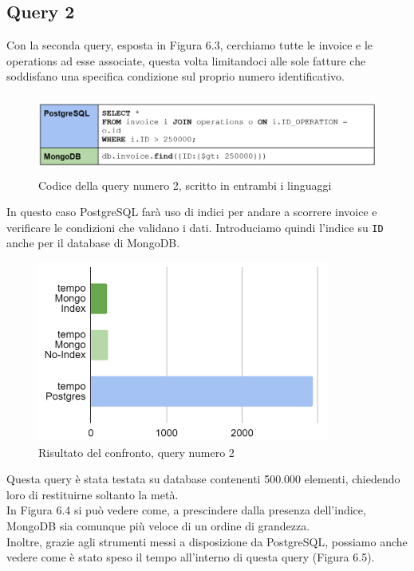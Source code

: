 \subsection{Query 2}
Con la seconda query, esposta in Figura 6.3, cerchiamo tutte le invoice e le operations ad esse associate, questa volta limitandoci alle sole fatture che soddisfano una specifica condizione sul proprio numero identificativo.\\

\begin{figure}[htbp]
\begin{center}
\includegraphics[height=7em]{immagini/query/query2.png}
\caption{Codice della query numero 2, scritto in entrambi i linguaggi}
\end{center}
\end{figure}

\noindent In questo caso PostgreSQL farà uso di indici per andare a scorrere invoice e verificare le condizioni che validano i dati. Introduciamo quindi l'indice su \texttt{ID} anche per il database di MongoDB.\\

\begin{figure}[htbp]
\begin{center}
\includegraphics[height=16em]{immagini/query/query2_results1.png}
\caption{Risultato del confronto, query numero 2}
\end{center}
\end{figure}

\noindent Questa query è stata testata su database contenenti 500.000 elementi, chiedendo loro di restituirne soltanto la metà.\\
In Figura 6.4 si può vedere come, a prescindere dalla presenza dell'indice, MongoDB sia comunque più veloce di un ordine di grandezza.\\
Inoltre, grazie agli strumenti messi a disposizione da PostgreSQL, possiamo anche vedere come è stato speso il tempo all'interno di questa query (Figura 6.5).

